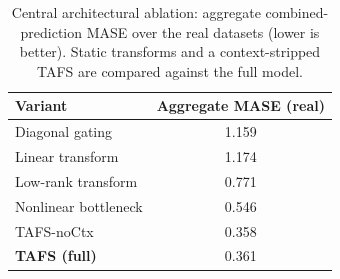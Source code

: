 \begin{table}[t]
\centering
\caption{Central architectural ablation: aggregate combined-prediction MASE over the real datasets (lower is better). Static transforms and a context-stripped TAFS are compared against the full model.}
\label{tab:ablation}
\small
\begin{tabular}{lc}
\toprule
Variant & Aggregate MASE (real) \\
\midrule
Diagonal gating & 1.159 \\
Linear transform & 1.174 \\
Low-rank transform & 0.771 \\
Nonlinear bottleneck & 0.546 \\
TAFS-noCtx & 0.358 \\
\textbf{TAFS (full)} & 0.361 \\
\bottomrule
\end{tabular}
\end{table}
